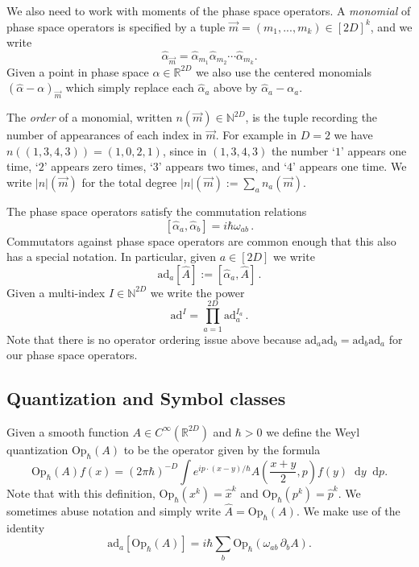 \documentclass[11pt]{amsart}
\def\bbN{{\mathbb{N}}}
\def\Op{\mathrm{Op}}
\def\ad{\mathrm{ad}}
\def\Real{{\mathbb R}}
\newcommand{\diff}{\mathop{}\!\mathrm{d}}
\numberwithin{equation}{section}
\begin{document}
We also need to work with moments of the phase space operators.  A \textit{monomial} of phase space operators is specified by
a tuple $\vec{m} = (m_1,...,m_k)\in[2D]^k$, and we write
\[
\hat{\alpha}_{\vec{m}} = \hat{\alpha}_{m_1} \hat{\alpha}_{m_2} \cdots \hat{\alpha}_{m_k}.
\]
Given a point in phase space $\alpha\in\Real^{2D}$ we also use the centered monomials $(\hat{\alpha}-\alpha)_{\vec{m}}$
which simply replace each $\hat{\alpha}_a$ above by $\hat{\alpha}_a-\alpha_a$.

The \textit{order} of a monomial, written $n(\vec{m})\in \bbN^{2D}$, is the tuple recording the number of appearances
of each index in $\vec{m}$.  For example in $D=2$ we have $n((1,3,4,3)) = (1,0,2,1)$, since in $(1,3,4,3)$ the number `$1$' appears one time, `$2$' appears zero times, `$3$' appears two times, and `$4$' appears one time.  We write $|n|(\vec{m})$ for the
total degree $|n|(\vec{m}) := \sum_a n_a(\vec{m})$.

The phase space operators satisfy the commutation relations
\[
[\hat{\alpha}_a,\hat{\alpha}_b] = i \hbar \omega_{ab}\,.
\]
Commutators against phase space operators are common enough that this also has a special notation.  In particular, given $a\in[2D]$
we write
\[
\ad_a[\hat{A}] := [\hat{\alpha}_a, \hat{A}]\,.
\]
Given a multi-index $I\in\bbN^{2D}$ we write the power
\[
\ad^I = \prod_{a=1}^{2D} \ad_a^{I_a}\,.
\]
Note that there is no operator ordering issue above because $\ad_a \ad_b = \ad_b\ad_a$ for our phase space operators.

\subsection{Quantization and Symbol classes}
Given a smooth function $A\in C^\infty(\Real^{2D})$ and $\hbar > 0$ we define the Weyl quantization $\Op_\hbar(A)$ to be the operator given by the formula
\[
\Op_\hbar(A)f(x) = (2\pi \hbar)^{-D}\int e^{i  p \cdot (x-y)/\hbar } A(\frac{x+y}{2},p) f(y) \diff y \diff p.
\]
Note that with this definition, $\Op_\hbar(x^k) = \hat{x}^k$ and $\Op_\hbar(p^k) =\hat{p}^k$.  We sometimes abuse notation and
simply write $\hat{A} = \Op_\hbar(A)$.  We make use of the identity
\[
\ad_a[ \Op_\hbar(A)] = i\hbar \sum_b \Op_\hbar( \omega_{ab}\, \partial_b A).
\]
\end{document}
